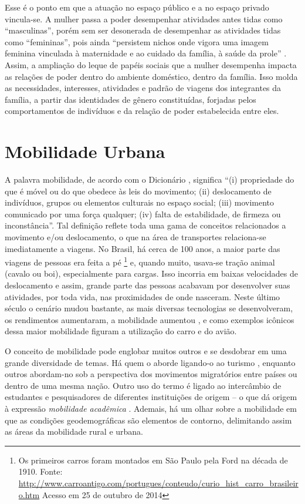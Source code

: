 Esse é o ponto em que a atuação no espaço público e a no espaço privado vincula-se.
A mulher passa a poder desempenhar atividades antes tidas como ``masculinas'', porém sem ser desonerada de desempenhar as atividades tidas como ``femininas'', pois  ainda ``persistem nichos onde vigora uma imagem feminina vinculada à maternidade e ao cuidado da família, à saúde da prole'' \cite[p.94]{BLAY2001}. 
Assim, a ampliação do leque de papéis sociais que a mulher desempenha impacta as relações de poder dentro do ambiente doméstico, dentro da família. Isso molda as necessidades, interesses, atividades e padrão de viagens dos integrantes da família, a partir das identidades de gênero constituídas, forjadas pelos comportamentos de indivíduos e da relação de poder estabelecida entre eles.

\clearpage
\section{Mobilidade Urbana}

A palavra mobilidade, de acordo com o Dicionário ,
significa ``(i) propriedade do que é móvel ou do que obedece às leis do movimento;
(ii) deslocamento de indivíduos, grupos ou elementos culturais no espaço social;
(iii) movimento comunicado por uma força qualquer;
(iv) falta de estabilidade, de firmeza ou inconstância''.
Tal definição reflete toda uma gama de conceitos relacionados a movimento e/ou deslocamento, o que na área de transportes relaciona-se imediatamente a viagens.
No Brasil, há cerca de 100 anos, a maior parte das viagens de pessoas era feita a pé%
\footnote{Os primeiros carros foram montados em São Paulo pela Ford na década de 1910. Fonte: \url{http://www.carroantigo.com/portugues/conteudo/curio_hist_carro_brasileiro.htm} Acesso em 25 de outubro de 2014} 
e, quando muito, usava-se tração animal (cavalo ou boi), especialmente para cargas. Isso incorria em baixas velocidades de deslocamento e assim, grande parte das pessoas acabavam por desenvolver suas atividades, por toda vida, nas proximidades de onde nasceram. Neste último século o cenário mudou bastante, as mais diversas tecnologias se desenvolveram, os rendimentos aumentaram, a mobilidade aumentou \cite[p.06]{METZ2012}, e como exemplos icônicos dessa maior mobilidade figuram a utilização do carro e do avião.

O conceito de mobilidade pode englobar muitos outros e se desdobrar em uma grande diversidade de temas.
Há quem o aborde ligando-o ao turismo \cite{ENLOE1989,FROHLICK2008}, enquanto outros \cite{CHANT1992,SILVEY2000} abordam-no sob a perspectiva dos movimentos migratórios entre países ou dentro de uma mesma nação. Outro uso do termo é ligado ao intercâmbio de estudantes e pesquisadores de diferentes instituições de origem – o que dá origem à expressão \emph{mobilidade acadêmica} \cite{ENDERS1998,TREMBLAY2005,HOFFMAN2008}. Ademais, há um olhar sobre a mobilidade em que as condições geodemográficas são elementos de contorno, delimitando assim as áreas da mobilidade rural e urbana.
 
